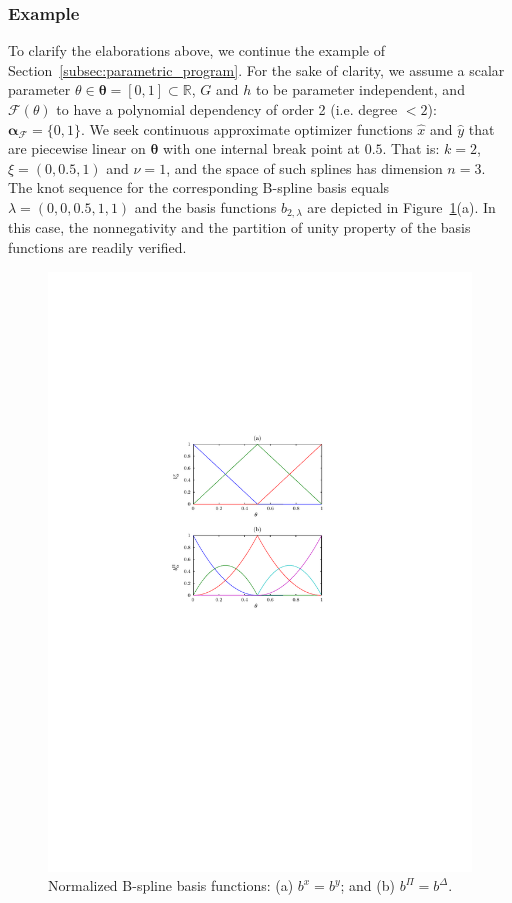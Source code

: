 \documentclass{article}
\newcommand{\R}{\mathbb{R}}         %
\newcommand{\ppar}{\theta}                          %
\newcommand{\Ppar}{{\bm{\theta}}}                   %
\newcommand{\calF}{\mathcal{F}}                     %
\newcommand{\bx}{b^x}               %
\newcommand{\by}{b^y}               %
\newcommand{\Alpha}{\bm{\alpha}}    %
\newcommand{\bPi}{b^\Pi}                %
\newcommand{\bDelta}{b^\Delta}          %
\begin{document}
\subsubsection{Example}

To clarify the elaborations above, we continue the example of Section~\ref{subsec:parametric_program}. For the sake of clarity, we assume a scalar parameter $\ppar\in\Ppar=[0,1]\subset\R$, $G$ and $h$ to be parameter independent, and $\calF(\ppar)$ to have a polynomial dependency of order 2 (i.e. degree $<2$): $\Alpha_\calF = \{0,1\}$. We seek continuous approximate optimizer functions $\hat{x}$ and $\hat{y}$ that are piecewise linear on $\Ppar$ with one internal break point at $0.5$. That is: $k=2$, $\xi = (0, 0.5, 1)$ and $\nu = 1$, and the space of such splines has dimension $n=3$. The knot sequence for the corresponding  B-spline basis equals $\lambda=(0,0,0.5,1,1)$ and the basis functions  $b_{2,\lambda}$ are depicted in Figure~\ref{fig:exSDP}(a). In this case, the nonnegativity and the partition of unity property of the basis functions are readily verified.

\begin{figure}[t]
\begin{center}
\includegraphics[scale=1]{b_exSDP.pdf}
\end{center}
\caption{Normalized B-spline basis functions: (a) $\bx=\by$; and (b) $\bPi=\bDelta$.} %
\label{fig:exSDP}
\end{figure}
\end{document}
